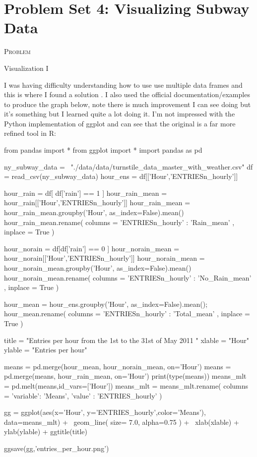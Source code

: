 \documentclass{article}
\newcommand{\ssection}[1]{
\phantomsection
\section*{#1}
\addcontentsline{toc}{section}{\protect\numberline{}#1}}
\numberwithin{questionCtr}{section}
\newcounter{problemCtr}
\newenvironment{problem}{%
   \bigskip\noindent%
   \refstepcounter{problemCtr}%
   \textsc{Problem \theproblemCtr}%
   \newline%
   }{\par\bigskip}  %
\numberwithin{problemCtr}{section}
\begin{document}
\section{Problem Set 4: Visualizing Subway Data}

\begin{problem}
  Visualization I
\end{problem}

I was having difficulty understanding how to use use multiple data frames and
this is where I found a solution \cite{stackoverflow-ggplot-multiple-df}.  I
also used the official documentation/examples to produce the graph below,
\cite{ggplot-python-docs} note there is much improvement I can see doing but
it's something but I learned quite a lot doing it.  I'm not impressed with the
Python implementation of ggplot and can see that the original is a far more
refined tool in R:

\begin{python1}
from pandas import *
from ggplot import *
import pandas as pd

ny_subway_data = \
    "./data/data/turnstile_data_master_with_weather.csv"
df = read_csv(ny_subway_data)
hour_ens = df[['Hour','ENTRIESn_hourly']]

hour_rain = df[ df['rain'] == 1 ]
hour_rain_mean = hour_rain[['Hour','ENTRIESn_hourly']]
hour_rain_mean = hour_rain_mean.groupby('Hour', as_index=False).mean()
hour_rain_mean.rename(
    columns = {'ENTRIESn_hourly' : 'Rain_mean' }, 
    inplace = True
)

hour_norain = df[df['rain'] == 0 ]
hour_norain_mean = hour_norain[['Hour','ENTRIESn_hourly']]
hour_norain_mean = hour_norain_mean.groupby('Hour', as_index=False).mean()
hour_norain_mean.rename(
    columns = {'ENTRIESn_hourly' : 'No_Rain_mean' }, 
    inplace = True
)

hour_mean = hour_ens.groupby('Hour', as_index=False).mean();
hour_mean.rename(
    columns = {'ENTRIESn_hourly' : 'Total_mean' },
    inplace = True
)

title = "Entries per hour from the 1st to the 31st of May 2011 "
xlable = "Hour"
ylable = "Entries per hour"

means = pd.merge(hour_mean, hour_norain_mean, on='Hour')
means = pd.merge(means, hour_rain_mean, on='Hour')
print(type(means))
means_mlt = pd.melt(means,id_vars=['Hour'])
means_mlt = means_mlt.rename(
    columns = {'variable': 'Means', 'value' : 'ENTRIES_hourly'}
)

gg = ggplot(aes(x='Hour', y='ENTRIES_hourly',color='Means'), data=means_mlt) + \
    geom_line(
        size= 7.0,
        alpha=0.75
    ) + \
    xlab(xlable) + ylab(ylable) + ggtitle(title)

ggsave(gg,'entries_per_hour.png')
\end{python1}
\end{document}
